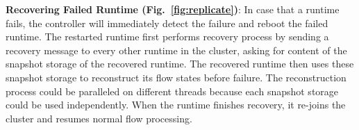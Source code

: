 \textbf{Recovering Failed Runtime (Fig.~\ref{fig:replicate})}: In case that a runtime fails, the controller will immediately detect the failure and reboot the failed runtime. The restarted runtime first performs recovery process by sending a recovery message to every other runtime in the cluster, asking for content of the snapshot storage of the recovered runtime. The recovered runtime then uses these snapshot storage to reconstruct its flow states before failure. The reconstruction process could be paralleled on different threads because each snapshot storage could be used independently.  When the runtime finishes recovery, it re-joins the cluster and resumes normal flow processing. 




